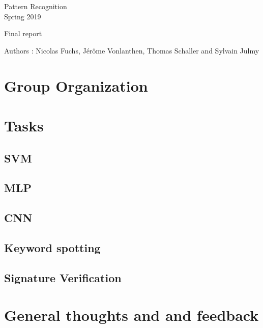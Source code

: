 \documentclass[a4paper,11pt]{report}
\date{\today}
\begin{document}
\begin{center}
  \large{
    Pattern Recognition\\
    Spring 2019
  }
  
  \noindent\makebox[\linewidth]{\rule{\linewidth}{0.4pt}}
  Final report
  \noindent\makebox[\linewidth]{\rule{\linewidth}{0.4pt}}

  \begin{flushleft}
    Authors : Nicolas Fuchs, Jérôme Vonlanthen, Thomas Schaller and Sylvain Julmy
  \end{flushleft}

  

  \noindent\makebox[\linewidth]{\rule{\textwidth}{1pt}}
\end{center}

\section*{Group Organization}

\section*{Tasks}

\subsection*{SVM}

\subsection*{MLP}

\subsection*{CNN}

\subsection*{Keyword spotting}

\subsection*{Signature Verification}

\section*{General thoughts and and feedback}
\end{document}
